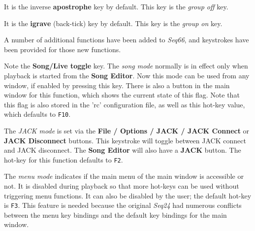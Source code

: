 
   It is the inverse \textbf{apostrophe} key by default.
   This key is the \textsl{group off} key.

   It is the \textbf{igrave} (back-tick) key by default.
   This key is the \textsl{group on} key.

   A number of additional functions have been added to \textsl{Seq66},
   and keystrokes have been provided for those new functions.

   \setcounter{ItemCounter}{0}      %

   Note the \textbf{Song/Live toggle} key.
   The \textsl{song mode} normally is in effect only when playback is started
   from the \textbf{Song Editor}.  Now this mode can be used from any
   window, if enabled by pressing this key.  There is also
   a button in the main window for this function, which shows the current state
   of this flag.  Note that this flag is also stored in the 'rc' configuration
   file, as well as this hot-key value, which defaults to \texttt{F10}.

   The \textsl{JACK mode} is set via the
   \textbf{File / Options / JACK / JACK Connect} or 
   \textbf{JACK Disconnect} buttons.
   This keystroke will toggle between JACK connect and JACK disconnect.
   The \textbf{Song Editor} will also have a \textbf{JACK} button.
   The hot-key for this function defaults to \texttt{F2}.

   The \textsl{menu mode} indicates if the main menu of the
   main window is accessible or not.  It is disabled during playback
   so that more hot-keys can be used without triggering menu functions.
   It can also be disabled by the user; the default hot-key is \texttt{F3}.
   This feature is needed because the original \textsl{Seq24} had numerous
   conflicts between the menu key bindings and the default key bindings for the
   main window.

